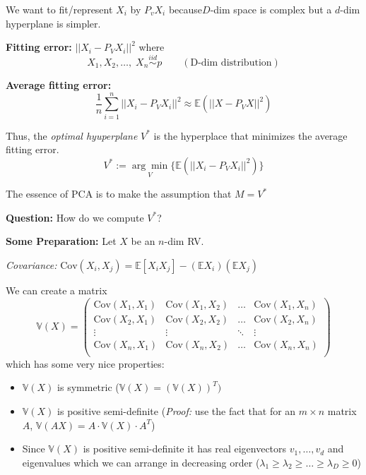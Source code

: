 \documentclass[12pt]{article}
\newcommand{\E}{\mathbb{E}}
\newcommand{\abs}[1]{\left\vert #1 \right\vert}
\newcommand{\iid}{\overset{iid}{\sim}}
\begin{document}
        We want to fit/represent $X_i$ by $P_vX_i$ because$D$-dim space is complex but a $d$-dim hyperplane is simpler. 

        \textbf{Fitting error:} $\abs{\abs{X_i - P_V X_i}}^2$
        where 
        \[X_1, X_2, \dots, \; X_n \iid p \qquad (\text{D-dim distribution})\]

        \textbf{Average fitting error:} 
        \[\frac{1}{n}\sum_{i=1}^n \abs{\abs{X_i - P_V X_i}}^2 \approx \E(\abs{\abs{X - P_VX}}^2)\] 

        Thus, the \emph{optimal hyuperplane} $V^*$ is the hyperplace that minimizes the average fitting error. 
        \[V^* := \underset{V}{\arg\min} \{\E(\abs{\abs{X_i - P_VX_i}}^2)\}\] 

        The essence of PCA is to make the assumption that $M = V^*$

        \textbf{Question:} How do we compute $V^*$? 

        \textbf{Some Preparation:}
        Let $X$ be an $n$-dim RV. 

        \emph{Covariance:} $\text{Cov}(X_i, X_j) = \E[X_iX_j] - (\E X_i)(\E X_j)$ 

        We can create a matrix 
        \[\mathbb{V}(X) = \begin{pmatrix}
            \text{Cov}(X_1, X_1) & \text{Cov}(X_1, X_2) & \dots & \text{Cov}(X_1, X_n)\\ 
            \text{Cov}(X_2, X_1) & \text{Cov}(X_2, X_2) & \dots & \text{Cov}(X_2, X_n)\\ 
            \vdots & \vdots & \ddots & \vdots\\
            \text{Cov}(X_n, X_1) & \text{Cov}(X_n, X_2) & \dots & \text{Cov}(X_n, X_n)\\
        \end{pmatrix}\]
        which has some very nice properties:
        \begin{itemize}
            \item $\mathbb{V}(X)$ is symmetric ($\mathbb{V}(X) = (\mathbb{V}(X))^T)$
            \item $\mathbb{V}(X)$ is positive semi-definite (\emph{Proof:} use the fact that for an $m\times n$ matrix $A$, $\mathbb{V}(AX) = A\cdot \mathbb{V}(X) \cdot A^T$)
            \item Since $\mathbb{V}(X)$ is positive semi-definite it has real eigenvectors $v_1, \dots, v_d$ and eigenvalues which we can arrange in decreasing order ($\lambda_1 \geq \lambda_2 \geq \dots \geq \lambda_D \geq 0$)
        \end{itemize}
\end{document}
